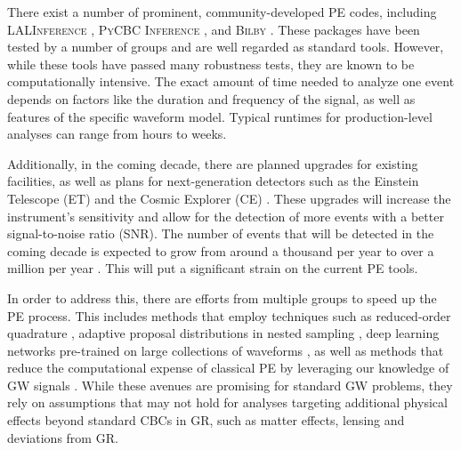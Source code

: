 \documentclass[twocolumn]{aastex631}
\newcommand{\mi}[1]{\textsf{\color{teal}[\textbf{MI:} #1]}}
\begin{document}
There exist a number of prominent, community-developed PE codes, including
\textsc{LALInference} \citep{Veitch:2014wba}, \textsc{PyCBC Inference}
\citep{Biwer:2018osg}, and \textsc{Bilby}
\citep{Ashton:2018jfp,Romero-Shaw:2020owr}.  These packages have been tested by a
number of groups and are well regarded as standard tools. However, while these
tools have passed many robustness tests, they are known to be computationally
intensive. The exact amount of time needed to analyze one event depends on
factors like the duration and frequency of the signal, as well as features of
the specific waveform model. Typical runtimes for production-level analyses can
range from hours to weeks. 

Additionally, in the coming decade, there are planned upgrades for existing
facilities, as well as plans for next-generation detectors such as the Einstein
Telescope (ET) \citep{Punturo:2010zz} and the Cosmic Explorer (CE)
\citep{LIGOScientific:2016wof}. These upgrades will increase the instrument's sensitivity
and allow for the detection of more events with a better
signal-to-noise ratio (SNR). The number of events that will be detected in the
coming decade is expected to grow from around a thousand per year to over a
million per year \citep{Baibhav:2019gxm}. This will put a significant strain on
the current PE tools.

In order to address this, there are efforts from multiple groups to speed up the
PE process. This includes methods that employ techniques such as
reduced-order quadrature \citep{Canizares:2014fya,Smith:2016qas}, adaptive proposal distributions in nested sampling
\citep{Williams:2021qyt}, deep learning networks pre-trained on large collections
of waveforms \citep{Dax:2021tsq,Dax:2022pxd}, as well as methods that reduce the
computational expense of classical PE by leveraging our knowledge of GW signals
\citep{Veitch:2014wba,Ashton:2021anp,Cornish:2021wxy,Islam:2022afg,Roulet:2022kot,Lee:2022jpn,Lange:2018pyp,Wofford:2022ykb}.
While these avenues are promising for standard GW problems, they rely on
assumptions that may not hold for analyses targeting additional physical effects
beyond standard CBCs in GR, such as matter effects, lensing and deviations from GR.

\end{document}
